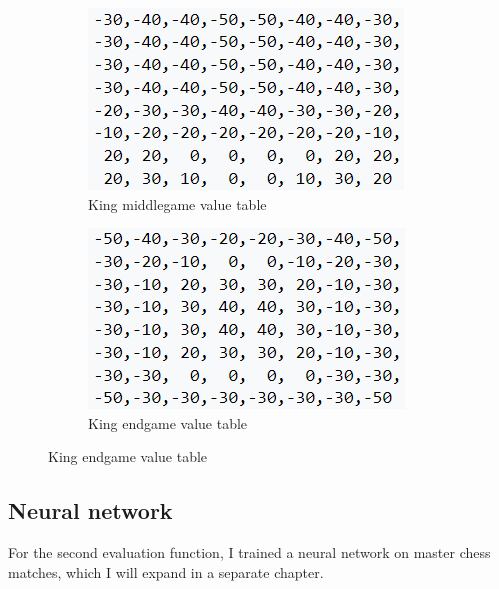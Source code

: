 \begin{figure}[h]
    \centering
    \caption{King tables}
    \begin{subfigure}{0.49\textwidth}
        \centering
        \includegraphics{figures/king_value_table_middlegame.png}
        \caption{King middlegame value table}
        \label{fig:kingValueTableMiddlegame}
    \end{subfigure}
    \begin{subfigure}{0.49\textwidth}
        \centering
        \includegraphics{figures/king_value_table_endgame.png}
        \caption{King endgame value table}
        \label{fig:kingValueTableEndgame}
    \end{subfigure}
\end{figure}

\subsection{Neural network}
\label{subsec:ch3sec3subsec2}

For the second evaluation function, I trained a neural network on master chess matches, which I will expand in a separate chapter.